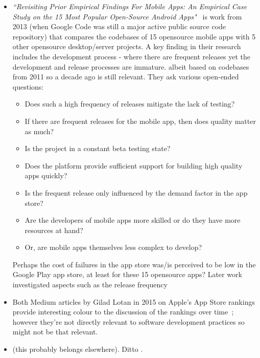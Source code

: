 \begin{itemize}
    \item \emph{``Revisiting Prior Empirical Findings For Mobile Apps: An Empirical Case Study on the 15 Most Popular Open-Source Android Apps"}~\citep{syer2013_empirical_findings_for_mobile_apps} is work from 2013 (when Google Code was still a major active public source code repository) that compares the codebases of 15 opensource mobile apps with 5 other opensource desktop/server projects. A key finding in their research includes the development process - where there are frequent releases yet the development and release processes are immature. albeit based on codebases from 2011 so a decade ago is still relevant. They ask various open-ended questions:
    \begin{itemize}
        \item Does such a high frequency of releases mitigate the lack of testing? 
        \item If there are frequent releases for the mobile app, then does quality matter as much?
        \item Is the project in a constant beta testing state? 
        \item Does the platform provide sufficient support for building high quality apps quickly? 
        \item Is the frequent release only influenced by the demand factor in the app store? 
        \item Are the developers of mobile apps more skilled or do they have more resources at hand? 
        \item Or, are mobile apps themselves less complex to develop?
    \end{itemize}
    
    Perhaps the cost of failures in the app store was/is perceived to be low in the Google Play app store, at least for these 15 opensource apps? Later work investigated aspects such as the release frequency~\citep{nayebi2016release}
    
    \item Both Medium articles by Gilad Lotan in 2015 on Apple's App Store rankings provide interesting colour to the discussion of the rankings over time~\citep{lotan2015_apple_apps_and_algorithmic_glitches, lotan2015_apples_app_charts}; however they're not directly relevant to software development practices so might not be that relevant.
    
    \item \citep{khalid2016_examining_the_relationship_between_findbugs_warnings_and_app_ratings} (this probably belongs elsewhere). Ditto \citep{not_cited_yet_necmiye2017_a_slr_opinion_mining_studies_from_mobile_app_store_reviews}. 
    
\end{itemize}


